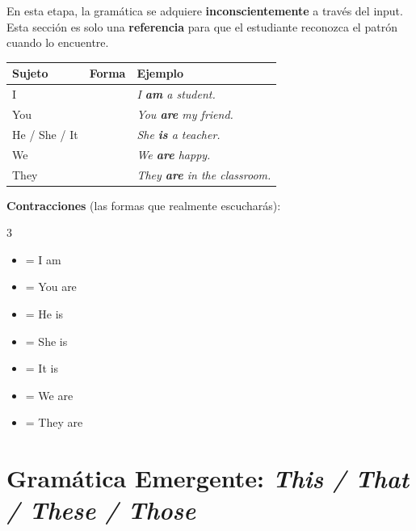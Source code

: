 \documentclass[12pt,a4paper]{article}
\begin{document}
\begin{cajagrammar}
En esta etapa, la gramática se adquiere \textbf{inconscientemente} a través del input. Esta sección es solo una \textbf{referencia} para que el estudiante reconozca el patrón cuando lo encuentre.

\medskip
\begin{tabularx}{\textwidth}{@{} l l X @{}}
\toprule
\textbf{Sujeto} & \textbf{Forma} & \textbf{Ejemplo} \\
\midrule
I & \eng{am} & \textit{I \textbf{am} a student.} \\
You & \eng{are} & \textit{You \textbf{are} my friend.} \\
He / She / It & \eng{is} & \textit{She \textbf{is} a teacher.} \\
We & \eng{are} & \textit{We \textbf{are} happy.} \\
They & \eng{are} & \textit{They \textbf{are} in the classroom.} \\
\bottomrule
\end{tabularx}

\medskip
\textbf{Contracciones} (las formas que realmente escucharás):
\begin{multicols}{3}
\begin{itemize}[nosep, leftmargin=0.6cm]
  \item {} = I am
  \item {} = You are
  \item {} = He is
  \item {} = She is
  \item {} = It is
  \item {} = We are
  \item {} = They are
\end{itemize}
\end{multicols}
\end{cajagrammar}

\section{Gramática Emergente: \textit{This / That / These / Those}}
\end{document}
